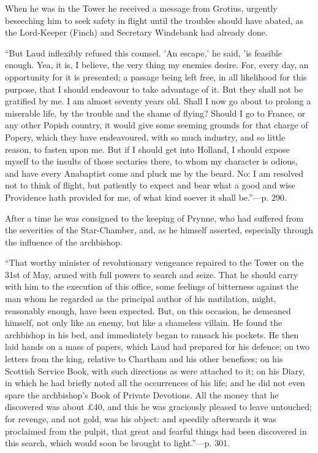 When he was in the Tower he received a message from
Grotius, urgently beseeching him to seek safety in flight until the
troubles should have abated, as the Lord-Keeper (Finch) and Secretary
Windebank had already done.

``But Laud inflexibly refused this
counsel. 'An escape,' he said, 'is feasible enough. Yea, it is, I
believe, the very thing my enemies desire. For, every day, an
opportunity for it is presented; a passage being left free, in all
likelihood for this purpose, that I should endeavour to take advantage
of it. But they shall not be gratified by me. I am almost seventy years
old. Shall I now go about to prolong a miserable life, by the trouble
and the shame of flying? Should I go to France, or any other Popish
country, it would give some seeming grounds for that charge of Popery,
which they have endeavoured, with so much industry, and so little
reason, to fasten upon me. But if I should get into Holland, I should
expose myself to the insults of those sectaries there, to whom my
character is odious, and have every Anabaptist come and pluck me by the
beard. No: I am resolved not to think of flight, but patiently to expect
and bear what a good and wise Providence hath provided for me, of what
kind soever it shall be.''—p. 290.

After a time he was consigned to the keeping of
Prynne, who had suffered from the severities of the Star-Chamber,
and, as he himself asserted, especially through the influence of the
archbishop.

``That worthy minister of
revolutionary vengeance repaired to the Tower on the 31st of May, armed
with full powers to search and seize. That he should carry with him to
the execution of this office, some feelings of bitterness against the
man whom he regarded as the principal author of his mutilation, might,
reasonably enough, have been expected. But, on this occasion, he
demeaned himself, not only like an enemy, but like a shameless villain.
He found the archbishop in his bed, and immediately began to ransack his
pockets. He then laid hands on a mass of papers, which Laud had prepared
for his defence; on two letters from the king, relative to Chartham and
his other benefices; on his Scottish Service Book, with such directions
as were attached to it; on his Diary, in which he had briefly noted all
the occurrences of his life; and he did not even spare the archbishop's
Book of Private Devotions. All the money that he discovered was about £40,
and this he was graciously pleased to leave untouched; for revenge, and
not gold, was his object: and speedily afterwards it was proclaimed from
the pulpit, that great and fearful things had been discovered in this
search, which would soon be brought to light.''—p. 301.


